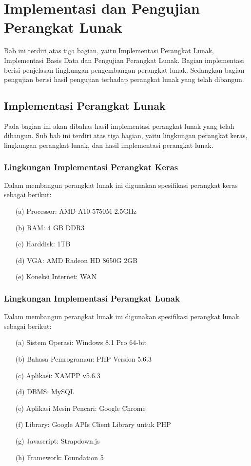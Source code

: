 \chapter{Implementasi dan Pengujian Perangkat Lunak}
\label{chap:implementasidanpengujian}

Bab ini terdiri atas tiga bagian, yaitu Implementasi Perangkat Lunak, Implementasi Basis Data dan Pengujian Perangkat Lunak. Bagian implementasi berisi penjelasan lingkungan pengembangan perangkat lunak. Sedangkan bagian pengujian berisi hasil pengujian terhadap perangkat lunak yang telah dibangun.

\section{Implementasi Perangkat Lunak}
\label{sec:implementasiperangkatlunak}

Pada bagian ini akan dibahas hasil implementasi perangkat lunak yang telah dibangun. Sub bab ini terdiri atas tiga bagian, yaitu lingkungan perangkat keras, lingkungan perangkat lunak, dan hasil implementasi perangkat lunak.

\subsection{Lingkungan Implementasi Perangkat Keras}
\label{sec:lingkunganimplementasiperangkatkeras}

Dalam membangun perangkat lunak ini digunakan spesifikasi perangkat keras sebagai berikut:

\begin{enumerate}
\item[(a)] Processor: AMD A10-5750M 2.5GHz
\item[(b)] RAM: 4 GB DDR3
\item[(c)] Harddisk: 1TB
\item[(d)] VGA: AMD Radeon HD 8650G 2GB
\item[(e)] Koneksi Internet: WAN
\end{enumerate}

\subsection{Lingkungan Implementasi Perangkat Lunak}
\label{sec:lingkunganimplementasiperangkatlunak}

Dalam membangun perangkat lunak ini digunakan spesifikasi perangkat lunak sebagai berikut:

\begin{enumerate}
\item[(a)] Sistem Operasi: Windows 8.1 Pro 64-bit
\item[(b)] Bahasa Pemrograman: PHP Version 5.6.3
\item[(c)] Aplikasi: XAMPP v5.6.3
\item[(d)] DBMS: MySQL
\item[(e)] Aplikasi Mesin Pencari: Google Chrome
\item[(f)] Library: Google APIs Client Library untuk PHP
\item[(g)] Javascript: Strapdown.js
\item[(h)] Framework: Foundation 5
\end{enumerate}

